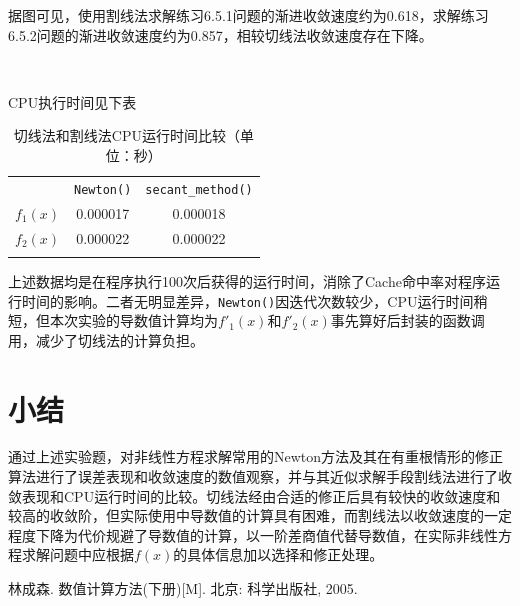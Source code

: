 \documentclass[UTF8,a4paper,10pt]{ctexart}
\begin{document}
        据图可见，使用割线法求解练习6.5.1问题的渐进收敛速度约为0.618，求解练习6.5.2问题的渐进收敛速度约为0.857，相较切线法收敛速度存在下降。
        \par
        \
        \par
        CPU执行时间见下表
        \begin{table}[htbp]%
            \centering
            \label{tab:1}  
            \begin{tabular}{ccc}%
                \hline\hline\noalign{\smallskip}	
                \  & \texttt{Newton()} & \texttt{secant\_method()} \\
                \noalign{\smallskip}\hline\noalign{\smallskip}
                $f_1(x)$ & 0.000017 & 0.000018  \\
                $f_2(x)$ & 0.000022  & 0.000022 \\
                \noalign{\smallskip}\hline
            \end{tabular}
            \caption{切线法和割线法CPU运行时间比较（单位：秒）}
        \end{table}
        \par
        上述数据均是在程序执行100次后获得的运行时间，消除了Cache命中率对程序运行时间的影响。二者无明显差异，\texttt{Newton()}因迭代次数较少，CPU运行时间稍短，但本次实验的导数值计算均为$f'_1(x)$和$f'_2(x)$事先算好后封装的函数调用，减少了切线法的计算负担。
        
\section{小结}
    \par
    通过上述实验题，对非线性方程求解常用的Newton方法及其在有重根情形的修正算法进行了误差表现和收敛速度的数值观察，并与其近似求解手段割线法进行了收敛表现和CPU运行时间的比较。切线法经由合适的修正后具有较快的收敛速度和较高的收敛阶，但实际使用中导数值的计算具有困难，而割线法以收敛速度的一定程度下降为代价规避了导数值的计算，以一阶差商值代替导数值，在实际非线性方程求解问题中应根据$f(x)$的具体信息加以选择和修正处理。

    \begin{thebibliography}{99}  
        林成森. 数值计算方法(下册)[M]. 北京: 科学出版社, 2005.
    \end{thebibliography}
\end{document}
